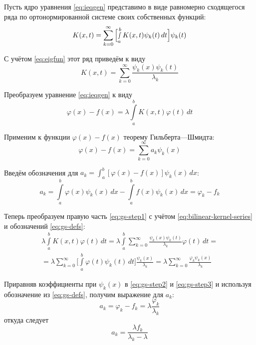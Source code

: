 \documentclass{article}
\numberwithin{equation}{section}
\renewcommand{\phi}{\varphi}
\newcommand{\intl}{\int\limits}
\begin{document}
Пусть ядро уравнения \eqref{eq:ieqgen} представимо в виде равномерно
сходящегося ряда по ортонормированной системе своих собственных
функций:
\begin{equation}
  K(x, t) = \sum_{k=0}^{\infty}{\Bigl [ \smallint_a^b{K(x, t)\psi_k(t)\,
      dt} \Bigr ] \psi_k(t)}
\end{equation}

С учётом \eqref{eq:eigfun} этот ряд приведём к виду
\begin{equation}
  \label{eq:bilinear-kernel-series}
  K(x, t) = \sum_{k=0}^{\infty}{\frac{\psi_k(x)\psi_k(t)}{\lambda_k}}
\end{equation}

Преобразуем уравнение \eqref{eq:ieqgen} к виду
\begin{equation}
  \label{eq:gs-step1}
  \phi(x)-f(x) = \lambda \intl_a^b{K(x, t) \phi(t)\,dt}
\end{equation}

Применим к функции $\phi(x)-f(x)$ теорему Гильберта—Шмидта:
\begin{equation}
  \label{eq:gs-step2}
  \phi(x)-f(x) = \sum_{k=0}^{\infty}{a_k \psi_k(x)}
\end{equation}

Введём обозначения для $a_k = \int_a^b{[\phi(x)-f(x)]\psi_k(x)\,dx}$:
\begin{equation}
  \label{eq:gs-defs}
  a_k = \intl_a^b{\phi(x)\psi_k(x)\,dx} - \intl_a^b{f(x)\psi_k(x)\,dx}
  = \phi_k-f_k
\end{equation}

Теперь преобразуем правую часть \eqref{eq:gs-step1} с учётом
\eqref{eq:bilinear-kernel-series} и обозначений \eqref{eq:gs-defs}:
\begin{multline}
  \label{eq:gs-step3}
  \lambda\intl_a^b{K(x, t) \phi(t)\,dt} =
  \lambda \intl_a^b\sum_{k=0}^\infty{\frac{\psi_k(x)\psi_k(t)}{\lambda_k}\phi(t)\,dt} =\\
  = \lambda \sum_{k=0}^\infty \biggl [ \intl_a^b{\phi(t)\psi_k(t)\,dt}
  \biggr ] \frac{\psi_k(x)}{\lambda_k} = \lambda \sum_{k=0}^\infty
  \frac{\phi_k \psi_k(x)}{\lambda_k}
\end{multline}

Приравняв коэффициенты при $\psi_k(x)$ в \eqref{eq:gs-step2} и
\eqref{eq:gs-step3} и используя обозначение из \eqref{eq:gs-defs},
получим выражение для $a_k$:
\begin{equation*}
  a_k = \phi_k-f_k = \lambda\frac{\phi_k}{\lambda_k}
\end{equation*}
откуда следует
\begin{equation}
  a_k = \frac{\lambda f_k}{\lambda_k - \lambda}
\end{equation}
\end{document}
